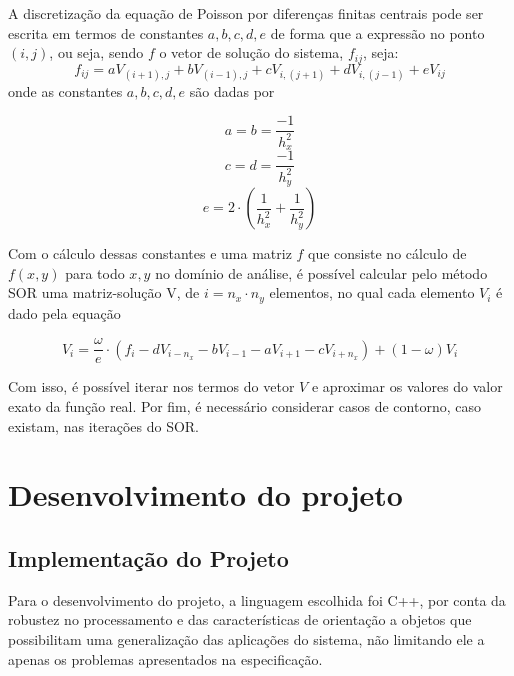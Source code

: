 \documentclass[oneside]{abntex2}
\begin{document}
A discretização da equação de Poisson por diferenças finitas centrais pode ser escrita em termos de constantes $a, b, c, d, e$ de forma que a expressão no ponto $(i,j)$, ou seja, sendo $f$ o vetor de solução do sistema, $f_{ij}$, seja:
\begin{equation}
    f_{ij} = aV_{(i+1), j} + bV_{(i-1), j} + cV_{i, (j+1)} + dV_{i, (j-1)} + eV_{ij}
\end{equation}
onde as constantes $a, b, c, d, e$ são dadas por

\begin{equation}
\label{eqConstAB}
    a = b = \frac{-1}{h_x^2}
\end{equation}
\begin{equation}
\label{eqConstCD}
    c = d = \frac{-1}{h_y^2}
\end{equation}
\begin{equation}
\label{eqConstE}
    e = 2 \cdot \left(\frac{1}{h_x^2} + \frac{1}{h_y^2}\right)
\end{equation}

Com o cálculo dessas constantes e uma matriz $f$ que consiste no cálculo de $f(x, y) $ para todo $x, y$ no domínio de análise, é possível calcular pelo método SOR uma matriz-solução V, de $i = n_x \cdot n_y$ elementos, no qual cada elemento $V_i$ é dado pela equação

\begin{equation}
\label{eqSORMain}
    V_i = \frac{\omega}{e} \cdot (f_i - dV_{i-n_x} - bV_{i-1} - aV_{i+1} - cV_{i+n_x}) + (1-\omega)V_i
\end{equation}

Com isso, é possível iterar nos termos do vetor $V$ e aproximar os valores do valor exato da função real. Por fim, é necessário considerar casos de contorno, caso existam, nas iterações do SOR. 
\chapter{Desenvolvimento do projeto}

\section{Implementação do Projeto} \label{sec_impl}
Para o desenvolvimento do projeto, a linguagem escolhida foi C++, por conta da robustez no processamento e das características de orientação a objetos que possibilitam uma generalização das aplicações do sistema, não limitando ele a apenas os problemas apresentados na especificação. 
\end{document}
